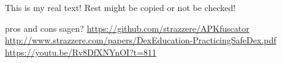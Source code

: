 This is my real text! Rest might be copied or not be checked!


pros and cons sagen?\newline
\url{https://github.com/strazzere/APKfuscator}\newline
\url{http://www.strazzere.com/papers/DexEducation-PracticingSafeDex.pdf}\newline
\url{https://youtu.be/Rv8DfXNYnOI?t=811}
